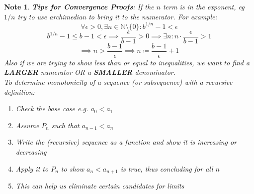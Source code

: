 \documentclass{article}
\newtheorem{note}{Note}[section]
\begin{document}
\medskip
\begin{note}
\textbf{Tips for Convergence Proofs}: If the $n$ term is in the exponent, eg $1/n$ try to use archimedian to bring it to the numerator. For example:
\begin{equation*}
    \forall \epsilon > 0, \exists n \in \mathbb{N} \setminus \{0\}: b^{1/n} - 1 < \epsilon
\end{equation*}
\begin{equation*}
    b^{1/n} - 1 \leqslant b - 1 < \epsilon \implies \frac{\epsilon}{b-1} > 0 \implies \exists n: n\cdot \frac{\epsilon}{b-1} > 1
\end{equation*}
\begin{equation*}
    \implies n > \frac{b-1}{\epsilon} \implies n \coloneq \frac{b-1}{\epsilon} + 1
\end{equation*}
Also if we are trying to show less than or equal to inequalities, we want to find a \textbf{LARGER} numerator OR a \textbf{SMALLER} denominator.\\

To determine monotonicity of a sequence (or subsequence) with a recursive definition:
\begin{enumerate}
    \item Check the base case e.g. $a_0 < a_1$
    \item Assume $P_n$ such that $a_{n-1} < a_n$
    \item Write the (recursive) sequence as a function and show it is increasing or decreasing
    \item Apply it to $P_n$ to show $a_n < a_{n+1}$ is true, thus concluding for all $n$
    \item This can help us eliminate certain candidates for limits
\end{enumerate}
\end{note}
\end{document}
